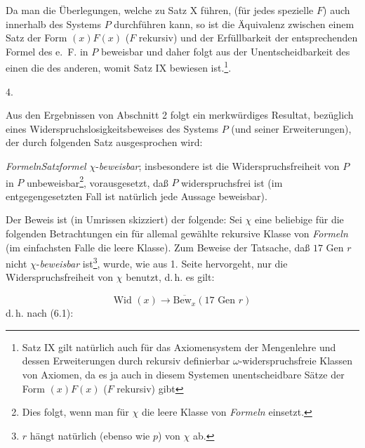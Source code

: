 \documentclass[draft]{scrartcl}
\begin{document}
Da man die Überlegungen, welche zu Satz X führen, (für jedes spezielle $F$) auch innerhalb des Systems $P$ durchführen kann, so ist die Äquivalenz zwischen einem Satz der Form $\left(x\right)F\left(x\right)$ ($F$ rekursiv) und der Erfüllbarkeit der entsprechenden Formel des e.~F. in $P$ beweisbar und daher folgt aus der Unentscheidbarkeit des einen die des anderen, womit Satz IX bewiesen ist.\footnote{Satz IX gilt natürlich auch für das Axiomensystem der Mengenlehre und dessen Erweiterungen durch rekursiv definierbar $\omega$-widerspruchsfreie Klassen von Axiomen, da es ja auch in diesem Systemen unentscheidbare Sätze der Form $\left(x\right)F\left(x\right)$ ($F$ rekursiv) gibt}.

\begin{center}
4.
\end{center}

Aus den Ergebnissen von Abschnitt 2 folgt ein merkwürdiges Resultat, bezüglich eines Widerspruchslosigkeitsbeweises des Systems $P$ (und seiner Erweiterungen), der durch folgenden Satz ausgesprochen wird:

\label{satzxi} \textit{Formeln}\textit{Satzformel} $\chi$-\textit{beweisbar}; insbesondere ist die Widerspruchsfreiheit von $P$ in $P$ unbeweisbar\footnote{Dies folgt, wenn man für
$\chi$ die leere Klasse von \textit{Formeln} einsetzt.},
vorausgesetzt, daß $P$ widerspruchsfrei ist (im entgegengesetzten Fall ist natürlich jede Aussage beweisbar).

Der Beweis ist (in Umrissen skizziert) der folgende: Sei $\chi$ eine beliebige für die folgenden
Betrachtungen ein für allemal gewählte rekursive Klasse von \textit{Formeln} (im einfachsten Falle die leere Klasse).
Zum Beweise der Tatsache, daß $17\text{ Gen }r$ nicht $\chi$-\textit{beweisbar} ist\footnote{$r$
hängt natürlich (ebenso wie $p$) von $\chi$ ab.}, wurde, wie aus 1. Seite \pageref{chibeweisbarkeit} hervorgeht,
nur die Widerspruchsfreiheit von $\chi$ benutzt, d.\,h. es gilt:

\begin{equation}
\text{Wid }\left(x\right) \longrightarrow \overline{\text{Bew}_x} \left(17\text{ Gen } r\right)
\end{equation}
d.\,h. nach (6.1):
\end{document}
